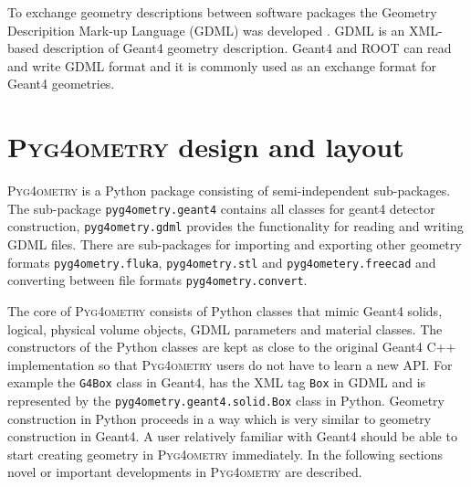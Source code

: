 \documentclass[final,5p,times,twocolumn]{elsarticle}
\newcommand{\PYGEOMETRY}{\textsc{Pyg4ometry}}
\begin{document}
To exchange geometry descriptions between software packages the Geometry Descripition Mark-up Language (GDML) was developed \cite{GDML}. 
GDML is an XML-based description of Geant4 geometry description. Geant4 and ROOT \cite{fons_rademakers_2019_3895860} can read and write 
GDML format and it is commonly used as an exchange format for Geant4 geometries. 

\section{\PYGEOMETRY{} design and layout}
\PYGEOMETRY{} is a Python package consisting of semi-independent sub-packages. The sub-package \lstinline{pyg4ometry.geant4} contains all classes for 
geant4 detector construction, \lstinline{pyg4ometry.gdml} provides the functionality for reading and writing GDML files. There are sub-packages for importing and exporting other geometry formats  \lstinline{pyg4ometry.fluka}, \lstinline{pyg4ometry.stl} and \lstinline{pyg4ometery.freecad} and converting between file formats \verb|pyg4ometry.convert|.

The core of \PYGEOMETRY{} consists of Python classes that mimic Geant4 solids, logical, physical volume objects, GDML parameters and material classes.
The constructors of the Python classes are kept as close to the original Geant4 C++ implementation so that \PYGEOMETRY{} users do not have to learn 
a new API. For example the \verb|G4Box| class in Geant4, has the XML tag \verb|Box| in GDML and is represented by the \lstinline{pyg4ometry.geant4.solid.Box} class in 
Python. Geometry construction in Python proceeds in a way which is very similar to geometry construction in Geant4. A user relatively familiar with Geant4
should be able to start creating geometry in \PYGEOMETRY{} immediately. In the following sections novel or important developments in \PYGEOMETRY{} are described.  
\end{document}
